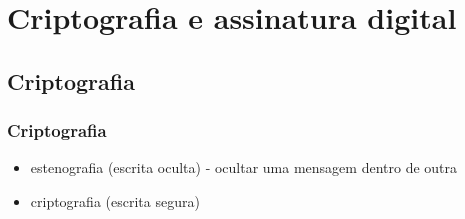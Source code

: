\section{Criptografia e assinatura digital}

\subsection{Criptografia}
\begin{frame}
\frametitle{Criptografia}

\begin{itemize}
\item estenografia (escrita oculta) - ocultar uma mensagem dentro de outra
\item criptografia (escrita segura)
\end{itemize}

\end{frame}



